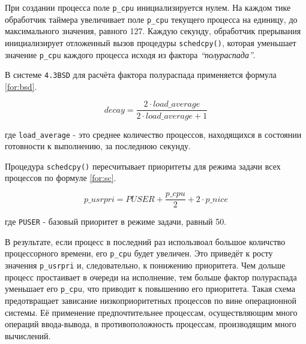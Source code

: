 При создании процесса поле \texttt{p\_cpu} инициализируется нулем. На каждом
тике обработчик таймера увеличивает поле \texttt{p\_cpu} текущего процесса на
единицу, до максимального значения, равного 127. Каждую секунду, обработчик
прерывания инициализирует отложенный вызов процедуры \texttt{schedcpy()},
которая уменьшает значение \texttt{p\_cpu} каждого процесса исходя из фактора
\textit{``полураспада''}.

В системе \texttt{4.3BSD} для расчёта фактора полураспада применяется формула
\eqref{for:bsd}.

\begin{equation}
    \label{for:bsd}
    decay = \frac{2 \cdot load\_average}{2 \cdot load\_average + 1}
\end{equation}

где \texttt{load\_average} - это среднее количество процессов, находящихся в
состоянии готовности к выполнению, за последнюю секунду.

Процедура \texttt{schedcpy()} пересчитывает приоритеты для режима задачи всех
процессов по формуле \eqref{for:sc}.

\begin{equation}
    \label{for:sc}
    p\_usrpri = PUSER + \frac{p\_cpu}{2} + 2 \cdot p\_nice
\end{equation}

где \texttt{PUSER} - базовый приоритет в режиме задачи, равный 50.

В результате, если процесс в последний раз использвоал большое количство
процессорного времени, его \texttt{p\_cpu} будет увеличен. Это приведёт к росту
значения \texttt{p\_usrpri} и, следовательно, к понижению приоритета. Чем
дольше процесс простаивает в очереди на исполнение, тем больше фактор
полураспада уменьшает его \texttt{p\_cpu}, что приводит к повышению его
приоритета. Такая схема предотвращает зависание низкоприоритетных процессов по
вине операционной системы. Её применение предпочтительнее процессам,
осуществляющим много операций ввода-вывода, в противоположность процессам,
производящим много вычислений.
